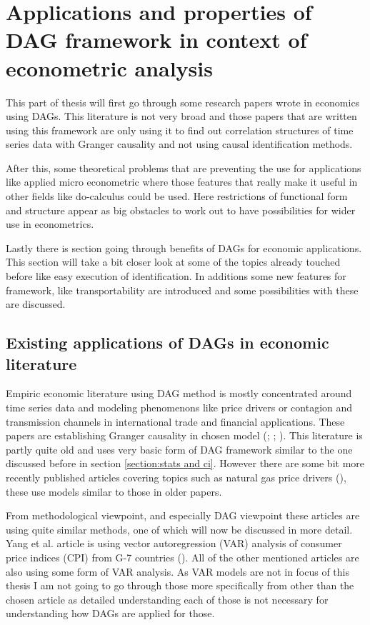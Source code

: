 \documentclass[main=english,12pt,a4paper,pdftex,econ,utf8]{aaltothesis}
\begin{document}
\clearpage

\section{Applications and properties of DAG framework in context of econometric analysis} \label{section:economics}

This part of thesis will first go through some research papers wrote in economics using DAGs. This literature is not very broad and those papers that are written using this framework are only using it to find out correlation structures of time series data with Granger causality and not using causal identification methods.

After this, some theoretical problems that are preventing the use for applications like applied micro econometric where those features that really make it useful in other fields like do-calculus could be used. Here restrictions of functional form and structure appear as big obstacles to work out to have possibilities for wider use in econometrics.

Lastly there is section going through benefits of DAGs for economic applications. This section will take a bit closer look at some of the topics already touched before like easy execution of identification. In additions some new features for framework, like transportability are introduced and some possibilities with these are discussed.

\subsection{Existing applications of DAGs in economic literature}

Empiric economic literature using DAG method is mostly concentrated around time series data and modeling phenomenons like price drivers or contagion and transmission channels in international trade and financial applications. These papers are establishing Granger causality in chosen model (\cite{Awokuse2003}; \cite{Bessler2003}; \cite{Yang2006}). This literature is partly quite old and uses very basic form of DAG framework similar to the one discussed before in section \ref{section:stats and ci}. However there are some bit more recently published articles covering topics such as natural gas price drivers (\cite{Ji2018}), these use models similar to those in older papers.

From methodological viewpoint, and especially DAG viewpoint these articles are using quite similar methods, one of which will now be discussed in more detail. Yang et al. article is using vector autoregression (VAR) analysis of consumer price indices (CPI) from G-7 countries (\cite{Yang2006}). All of the other mentioned articles are also using some form of VAR analysis. As VAR models are not in focus of this thesis I am not going to go through those more specifically from other than the chosen article as detailed understanding each of those is not necessary for understanding how DAGs are applied for those.
\end{document}
